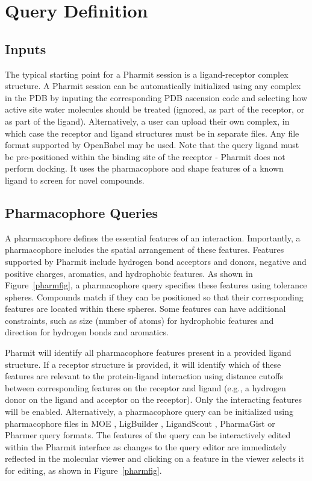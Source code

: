 \section{Query Definition}


\subsection{Inputs}

The typical starting point for a Pharmit session is a ligand-receptor complex structure. A Pharmit session can be automatically initialized using any complex in the PDB by inputing the corresponding PDB ascension code and selecting how active site water molecules should be treated (ignored, as part of the receptor, or as part of the ligand).  Alternatively, a user can upload their own complex, in which case the receptor and ligand structures must be in separate files. Any file format supported by OpenBabel \cite{O_Boyle_2011} may be used.  Note that the query ligand must be pre-positioned within the binding site of the receptor - Pharmit does not perform docking. It uses the pharmacophore and shape features of a known ligand to screen for novel compounds.

\subsection{Pharmacophore Queries}
A pharmacophore \cite{Koes_2015rev,Yang_2010,Leach_2010} defines the essential features of an interaction. Importantly, a pharmacophore includes the spatial arrangement of these features. 
Features supported by Pharmit include hydrogen bond acceptors and donors,  negative and positive charges, aromatics, and hydrophobic features.
As shown in Figure~\ref{pharmfig}, a pharmacophore query specifies these features using tolerance spheres.  Compounds match if they can be positioned so that their corresponding features are located within these spheres. Some features can have additional constraints, such as size (number of atoms) for hydrophobic features and direction for hydrogen bonds and aromatics.

Pharmit will identify all pharmacophore features present in a provided ligand structure. If a receptor structure is provided, it will identify which of these features are relevant to the protein-ligand interaction using distance cutoffs between corresponding features on the receptor and ligand (e.g., a hydrogen donor on the ligand and acceptor on the receptor). Only the interacting features will be enabled. Alternatively, a pharmacophore query can be initialized using pharmacophore files in MOE \cite{moe}, LigBuilder \cite{Wang_2000}, LigandScout \cite{Wolber_2005}, PharmaGist \cite{Schneidman_Duhovny_2008} or Pharmer \cite{Koes_2011} query formats.  The features of the query can be interactively edited within the Pharmit interface as changes to the query editor are immediately reflected in the molecular viewer and clicking on a feature in the viewer selects it for editing, as shown in Figure~\ref{pharmfig}.


